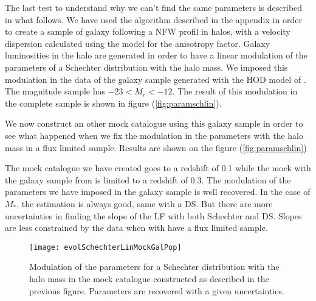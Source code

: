 The last test to understand why we can't find the same parameters is described in what follows. We have used the algorithm described
in the appendix  in order to create a
sample of galaxy following a NFW profil in halos, with a velocity dispersion calculated using the \citet{ML05} model for the
anisotropy factor. Galaxy luminosities in the halo are generated in order to have a linear modulation of the parameters of a
Schechter distribution with the halo mass. We imposed this modulation in the data of the galaxy sample generated with the HOD model
of \cite{Zehavi+11}. The magnitude sample has $\num{-23}<M_r<\num{-12}$. The result of this modulation in the complete sample is
shown in figure (\ref{fig:paramschlin}).

We now construct an other mock catalogue using this galaxy sample in order to see what happened when we fix the modulation in the
parameters with the halo mass in a flux limited sample.
Results are shown on the figure (\ref{fig:paramschlin})

The mock catalogue we have created goes to a redshift of \num{0.1} while the mock with the galaxy sample from \citet{Guo+11} is
limited to a redshift of \num{0.3}.
The modulation of the parameters we have imposed in the galaxy sample is well recovered. In the case of $M_*$, the estimation
is always good, same with a DS. But there are more uncertainties in finding the slope of the LF with both Schechter and DS. Slopes
are less constrained by the data when with have a flux limited sample.
\begin{figure}[htb]
	\centering
	\texttt{[image: evolSchechterLinMockGalPop]}
	\caption{\footnotesize{}Modulation of the parameters for a Schechter distribution with the halo mass in the mock catalogue
	constructed as described in the previous figure. Parameters are recovered with a given uncertainties.}
	\label{fig:paramschlinmock}
\end{figure}

